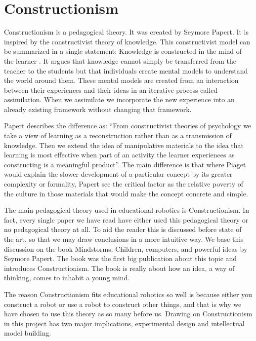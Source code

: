 \chapter{Constructionism}
Constructionism is a pedagogical theory. It was created by Seymore Papert. It is inspired by the constructivist theory of knowledge. This constructivist model can be summarized in a single statement: Knowledge is constructed in the mind of the learner \cite{bodner1986constructivism}. It argues that knowledge cannot simply be transferred from the teacher to the students but that individuals create mental models to understand the world around them. These mental models are created from an interaction between their experiences and their ideas in an iterative process called assimilation. When we assimilate we incorporate the new experience into an already existing framework without changing that framework. 

\bigskip\noindent
Papert describes the difference as: ``From constructivist theories of psychology we take a view of learning as a reconstruction rather than as a transmission of knowledge. Then we extend the idea of manipulative materials to the idea that learning is most effective when part of an activity the learner experiences as constructing is a meaningful product''. The main difference is that where Piaget would explain the slower development of a particular concept by its greater complexity or formality, Papert see the critical factor as the relative poverty of the culture in those materials that would make the concept concrete and simple.

\bigskip\noindent
The main pedagogical theory used in educational robotics is Constructionism. In fact, every single paper we have read have either used this pedagogical theory or no pedagogical theory at all. To aid the reader this is discussed before state of the art, so that we may draw conclusions in a more intuitive way. We base this discussion on the book Mindstorms: Children, computers, and powerful ideas\cite{papert1980mindstorms} by Seymore Papert. The book was the first big publication about this topic and introduces Constructionism. The book is really about how an idea, a way of thinking, comes to inhabit a young mind.

\bigskip\noindent
The reason Constructionism fits educational robotics so well is because either you construct a robot or use a robot to construct other things, and that is why we have chosen to use this theory as so many before us. Drawing on Constructionism in this project has two major implications, experimental design and intellectual model building. 

